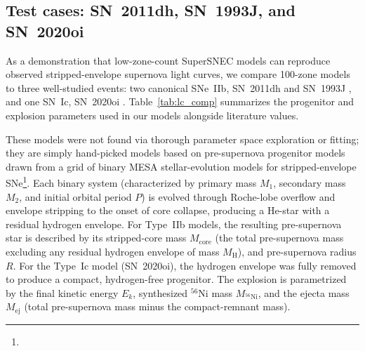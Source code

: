 \documentclass[twocolumn,linenumbers]{aastex701}
\begin{document}
\subsection{Test cases: SN~2011dh, SN~1993J, and SN~2020oi}
\label{sec:lc_comp}

As a demonstration that low-zone-count SuperSNEC models can reproduce observed stripped-envelope supernova light curves, we compare 100-zone models to three well-studied events: two canonical SNe~IIb, SN~2011dh \citep{Ergon2014} and SN~1993J \citep{Richmond1994}, and one SN~Ic, SN~2020oi \citep{Rho2021}. Table~\ref{tab:lc_comp} summarizes the progenitor and explosion parameters used in our models alongside literature values.

These models were not found via thorough parameter space exploration or fitting; they are simply hand-picked models based on pre-supernova progenitor models drawn from a grid of binary MESA \citep{Paxton2011,Paxton2013} stellar-evolution models for stripped-envelope SNe\footnote{}. Each binary system (characterized by primary mass $M_1$, secondary mass $M_2$, and initial orbital period $P$) is evolved through Roche-lobe overflow and envelope stripping to the onset of core collapse, producing a He-star with a residual hydrogen envelope. For Type~IIb models, the resulting pre-supernova star is described by its stripped-core mass $M_\mathrm{core}$ (the total pre-supernova mass excluding any residual hydrogen envelope of mass $M_\mathrm{H}$), and pre-supernova radius $R$. For the Type~Ic model (SN~2020oi), the hydrogen envelope was fully removed to produce a compact, hydrogen-free progenitor. The explosion is parametrized by the final kinetic energy $E_k$, synthesized $^{56}$Ni mass $M_{^{56}\mathrm{Ni}}$, and the ejecta mass $M_\mathrm{ej}$ (total pre-supernova mass minus the compact-remnant mass).
\end{document}
